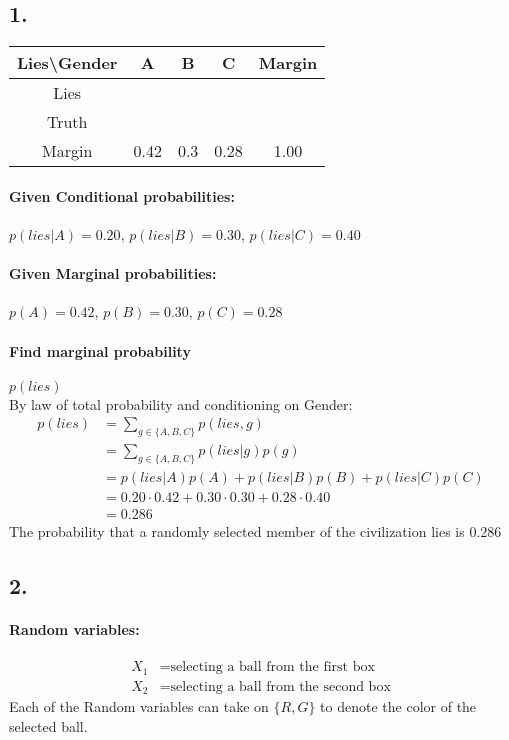 \documentclass{article}
\begin{document}
\subsection*{1.}
\begin{center}
	\begin{tabular}{c|c c c|c}
		Lies\textbackslash Gender & A & B & C & Margin\\
		\hline
		Lies\\
	  Truth	\\
		\hline
		Margin & 0.42 & 0.3 & 0.28 & 1.00\\
	\end{tabular}
\end{center}

\paragraph{Given Conditional probabilities:}$p(lies|A) = 0.20$, $p(lies|B) =
	0.30$, $p(lies|C) = 0.40$
\paragraph{Given Marginal probabilities:}$p(A) = 0.42$, $p(B) = 0.30$, 
	$p(C) = 0.28$
\paragraph{Find marginal probability}$p(lies)$ \\
	By law of total probability and conditioning on Gender:
	\begin{align*}
		p(lies) &= \sum_{g\in\{A,B,C\}}p(lies,g)\\
		        &= \sum_{g\in\{A,B,C\}}p(lies|g)p(g)\\
		        &= p(lies|A)p(A) + p(lies|B)p(B) + p(lies|C)p(C)\\
		        &= 0.20 \cdot 0.42 + 0.30 \cdot 0.30 + 0.28 \cdot 0.40\\
						&= 0.286
	\end{align*}
	The probability that a randomly selected member of the civilization lies is
	$0.286$

\subsection*{2.}
\paragraph{Random variables:}
\begin{align*}
X_1 &= \text{selecting a ball from the first box}\\
X_2 &= \text{selecting a ball from the second box}
\end{align*}
Each of the Random variables can take on $\{R, G\}$ to denote the color of the
selected ball.
\end{document}
